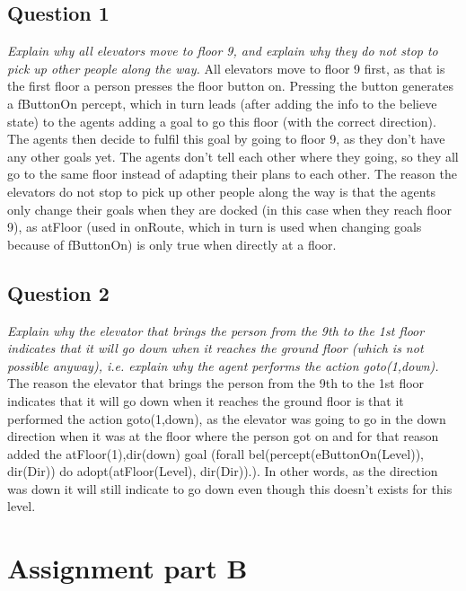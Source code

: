 \documentclass[a4paper,11pt]{article}
\begin{document}
\subsection{Question 1}
\textit{Explain why all elevators move to floor 9, and explain why they do not stop to pick up other people along the way.}
\newline\newline
All elevators move to floor 9 first, as that is the first floor a person presses the floor button on. Pressing the button generates a fButtonOn percept, which in turn leads (after adding the info to the believe state) to the agents adding a goal to go this floor (with the correct direction). The agents then decide to fulfil this goal by going to floor 9, as they don't have any other goals yet. The agents don't tell each other where they going, so they all go to the same floor instead of adapting their plans to each other.
\newline\newline
The reason the elevators do not stop to pick up other people along the way is that the agents only change their goals when they are docked (in this case when they reach floor 9), as atFloor (used in onRoute, which in turn is used when changing goals because of fButtonOn) is only true when directly at a floor.

\subsection{Question 2}

\textit{Explain why the elevator that brings the person from the 9th to the 1st floor indicates that it will go down when it reaches the ground floor (which is not possible anyway), i.e. explain why the agent performs the action goto(1,down).}
\newline\newline
The reason the elevator that brings the person from the 9th to the 1st floor indicates that it will go down when it reaches the ground floor is that it performed the action goto(1,down), as the elevator was going to go in the down direction when it was at the floor where the person got on and for that reason added the atFloor(1),dir(down) goal (forall bel(percept(eButtonOn(Level)), dir(Dir)) do adopt(atFloor(Level), dir(Dir)).). In other words, as the direction was down it will still indicate to go down even though this doesn't exists for this level.

\section{Assignment part B}
\end{document}
